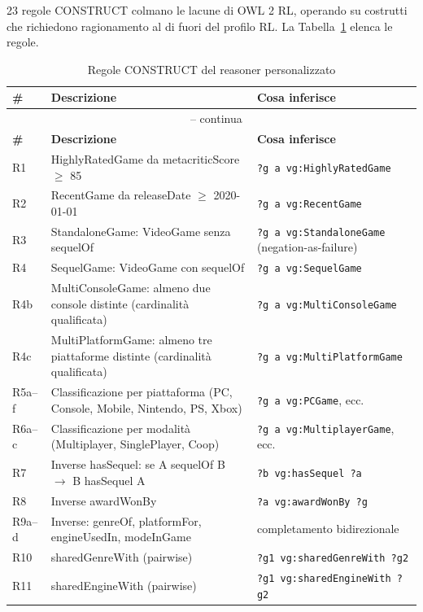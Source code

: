 23 regole CONSTRUCT colmano le lacune di OWL 2 RL, operando su costrutti che
richiedono ragionamento al di fuori del profilo RL. La Tabella~\ref{tab:construct_rules}
elenca le regole.

\begin{longtable}{lp{6cm}l}
\caption{Regole CONSTRUCT del reasoner personalizzato}\label{tab:construct_rules}\\
\toprule
\textbf{\#} & \textbf{Descrizione} & \textbf{Cosa inferisce} \\
\midrule
\endfirsthead
\multicolumn{3}{c}{\tablename\ \thetable{} -- continua} \\
\toprule
\textbf{\#} & \textbf{Descrizione} & \textbf{Cosa inferisce} \\
\midrule
\endhead
\bottomrule
\endlastfoot

R1 & HighlyRatedGame da metacriticScore $\geq$ 85     & \texttt{?g a vg:HighlyRatedGame} \\
R2 & RecentGame da releaseDate $\geq$ 2020-01-01      & \texttt{?g a vg:RecentGame} \\
R3 & StandaloneGame: VideoGame senza sequelOf          & \texttt{?g a vg:StandaloneGame} (negation-as-failure) \\
R4 & SequelGame: VideoGame con sequelOf                & \texttt{?g a vg:SequelGame} \\
R4b & MultiConsoleGame: almeno due console distinte (cardinalit\`a qualificata) & \texttt{?g a vg:MultiConsoleGame} \\
R4c & MultiPlatformGame: almeno tre piattaforme distinte (cardinalit\`a qualificata) & \texttt{?g a vg:MultiPlatformGame} \\
R5a--f& Classificazione per piattaforma (PC, Console, Mobile, Nintendo, PS, Xbox) & \texttt{?g a vg:PCGame}, ecc. \\
R6a--c& Classificazione per modalit\`a (Multiplayer, SinglePlayer, Coop) & \texttt{?g a vg:MultiplayerGame}, ecc. \\
R7 & Inverse hasSequel: se A sequelOf B $\rightarrow$ B hasSequel A & \texttt{?b vg:hasSequel ?a} \\
R8 & Inverse awardWonBy & \texttt{?a vg:awardWonBy ?g} \\
R9a--d& Inverse: genreOf, platformFor, engineUsedIn, modeInGame & completamento bidirezionale \\
R10 & sharedGenreWith (pairwise) & \texttt{?g1 vg:sharedGenreWith ?g2} \\
R11 & sharedEngineWith (pairwise) & \texttt{?g1 vg:sharedEngineWith ?g2} \\
\bottomrule
\end{longtable}

